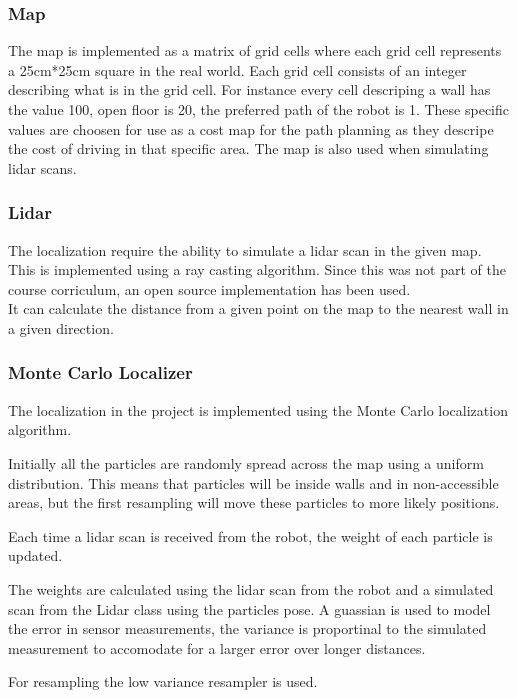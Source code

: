 \subsubsection{Map}
The map is implemented as a matrix of grid cells where each grid cell represents a 25cm*25cm square in the real world.
Each grid cell consists of an integer describing what is in the grid cell. For instance every cell descriping a wall has the value 100, open floor is 20, the preferred path of the robot is 1.
These specific values are choosen for use as a cost map for the path planning as they descripe the cost of driving in that specific area.
The map is also used when simulating lidar scans.

\subsubsection{Lidar}
The localization require the ability to simulate a lidar scan in the given map.
This is implemented using a ray casting algorithm.
Since this was not part of the course corriculum, an open source implementation has been used.\\

It can calculate the distance from a given point on the map to the nearest wall in a given direction.

\subsubsection{Monte Carlo Localizer}
The localization in the project is implemented using the Monte Carlo localization algorithm.

Initially all the particles are randomly spread across the map using a uniform distribution.
This means that particles will be inside walls and in non-accessible areas, but the first resampling will move these particles to more likely positions.

Each time a lidar scan is received from the robot, the weight of each particle is updated.

The weights are calculated using the lidar scan from the robot and a simulated scan from the Lidar class using the particles pose.
A guassian is used to model the error in sensor measurements, the variance is proportinal to the simulated measurement to accomodate for a larger error over longer distances.

For resampling the low variance resampler is used.

